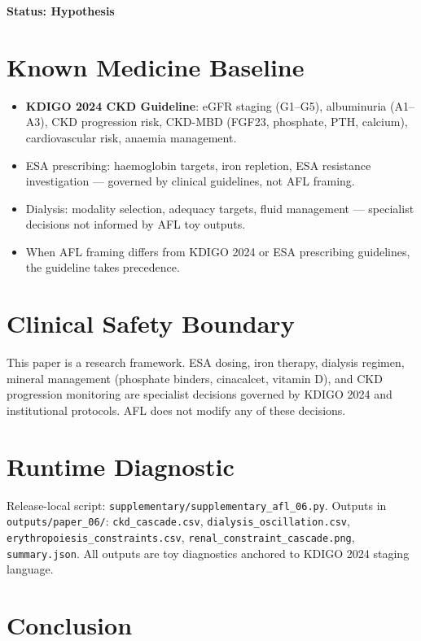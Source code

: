 \documentclass[12pt,a4paper]{article}
\begin{document}
\textbf{Status: Hypothesis}

\section{Known Medicine Baseline}

\begin{itemize}
    \item \textbf{KDIGO 2024 CKD Guideline}: eGFR staging (G1--G5), albuminuria (A1--A3), CKD progression risk, CKD-MBD (FGF23, phosphate, PTH, calcium), cardiovascular risk, anaemia management.
    \item ESA prescribing: haemoglobin targets, iron repletion, ESA resistance investigation — governed by clinical guidelines, not AFL framing.
    \item Dialysis: modality selection, adequacy targets, fluid management — specialist decisions not informed by AFL toy outputs.
    \item When AFL framing differs from KDIGO 2024 or ESA prescribing guidelines, the guideline takes precedence.
\end{itemize}

\section{Clinical Safety Boundary}

This paper is a research framework. ESA dosing, iron therapy, dialysis regimen, mineral management (phosphate binders, cinacalcet, vitamin D), and CKD progression monitoring are specialist decisions governed by KDIGO 2024 and institutional protocols. AFL does not modify any of these decisions.

\section{Runtime Diagnostic}

Release-local script: \texttt{supplementary/supplementary\_afl\_06.py}. Outputs in \texttt{outputs/paper\_06/}: \texttt{ckd\_cascade.csv}, \texttt{dialysis\_oscillation.csv}, \texttt{erythropoiesis\_constraints.csv}, \texttt{renal\_constraint\_cascade.png}, \texttt{summary.json}. All outputs are toy diagnostics anchored to KDIGO 2024 staging language.

\section{Conclusion}
\end{document}
